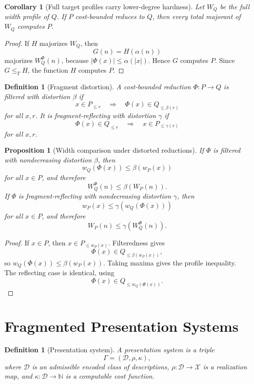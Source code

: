 \documentclass[11pt]{article}
\newtheorem{proposition}[theorem]{Proposition}
\newtheorem{corollary}[theorem]{Corollary}
\newtheorem{definition}[theorem]{Definition}
\begin{document}
\begin{corollary}[Full target profiles carry lower-degree hardness]
Let \(W_Q\) be the full width profile of \(Q\). If \(P\) cost-bounded reduces to \(Q\), then every total majorant of \(W_Q\) computes \(P\).
\end{corollary}

\begin{proof}
If \(H\) majorizes \(W_Q\), then
\[
G(n)=H(\alpha(n))
\]
majorizes \(W_Q^\Phi(n)\), because \(|\Phi(x)|\le \alpha(|x|)\). Hence \(G\) computes \(P\). Since \(G\le_T H\), the function \(H\) computes \(P\).
\end{proof}

\begin{definition}[Fragment distortion]
A cost-bounded reduction \(\Phi:P\to Q\) is filtered with distortion \(\beta\) if
\[
x\in P_{\le r}
\quad\Longrightarrow\quad
\Phi(x)\in Q_{\le \beta(r)}
\]
for all \(x,r\). It is fragment-reflecting with distortion \(\gamma\) if
\[
\Phi(x)\in Q_{\le r}
\quad\Longrightarrow\quad
x\in P_{\le \gamma(r)}
\]
for all \(x,r\).
\end{definition}

\begin{proposition}[Width comparison under distorted reductions]
If \(\Phi\) is filtered with nondecreasing distortion \(\beta\), then
\[
w_Q(\Phi(x))\le \beta(w_P(x))
\]
for all \(x\in P\), and therefore
\[
W_Q^\Phi(n)\le \beta(W_P(n)).
\]
If \(\Phi\) is fragment-reflecting with nondecreasing distortion \(\gamma\), then
\[
w_P(x)\le \gamma(w_Q(\Phi(x)))
\]
for all \(x\in P\), and therefore
\[
W_P(n)\le \gamma(W_Q^\Phi(n)).
\]
\end{proposition}

\begin{proof}
If \(x\in P\), then \(x\in P_{\le w_P(x)}\). Filteredness gives
\[
\Phi(x)\in Q_{\le \beta(w_P(x))},
\]
so \(w_Q(\Phi(x))\le \beta(w_P(x))\). Taking maxima gives the profile inequality. The reflecting case is identical, using
\[
\Phi(x)\in Q_{\le w_Q(\Phi(x))}.
\]
\end{proof}

\section{Fragmented Presentation Systems}

\begin{definition}[Presentation system]
A presentation system is a triple
\[
\Gamma=(\mathcal D,\rho,\kappa),
\]
where \(\mathcal D\) is an admissible encoded class of descriptions, \(\rho:\mathcal D\to\mathcal X\) is a realization map, and \(\kappa:\mathcal D\to\mathbb N\) is a computable cost function.
\end{definition}
\end{document}
